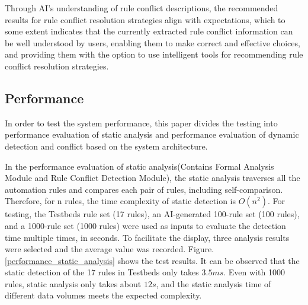 Through AI's understanding of rule conflict descriptions, the recommended results for rule conflict resolution strategies align with expectations, which to some extent indicates that the currently extracted rule conflict information can be well understood by users, enabling them to make correct and effective choices, and providing them with the option to use intelligent tools for recommending rule conflict resolution strategies.

\subsection{Performance} 
In order to test the system performance, this paper divides the testing into performance evaluation of static analysis and performance evaluation of dynamic detection and conflict based on the system architecture.

In the performance evaluation of static analysis(Contains Formal Analysis Module and Rule Conflict Detection Module), the static analysis traverses all the automation rules and compares each pair of rules, including self-comparison. Therefore, for n rules, the time complexity of static detection is $O\left(n^2\right)$. For testing, the Testbeds rule set (17 rules), an AI-generated 100-rule set (100 rules), and a 1000-rule set (1000 rules) were used as inputs to evaluate the detection time multiple times, in seconds. To facilitate the display, three analysis results were selected and the average value was recorded. Figure.\ref{performance_static_analysis} shows the test results. It can be observed that the static detection of the 17 rules in Testbeds only takes $3.5ms$. Even with 1000 rules, static analysis only takes about $12s$, and the static analysis time of different data volumes meets the expected complexity.

